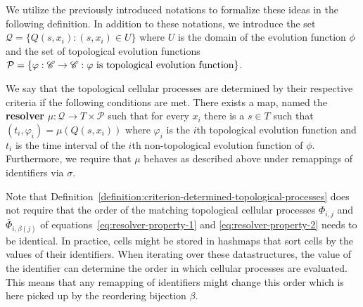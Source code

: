We utilize the previously introduced notations to formalize these ideas in the following definition.
In addition to these notations, we introduce the set $\mathcal{Q}=\{Q(s,x_i):(s,x_i)\in U\}$ where
$U$ is the domain of the evolution function $\phi$ and the set of topological evolution functions
$\mathcal{P}=\{\varphi:\mathscr{C}\rightarrow\mathscr{C}:\varphi\text{ is topological evolution function}\}$.

\begin{definition}
    We say that the topological cellular processes are determined by their respective criteria if
    the following conditions are met.
    There exists a map, named the \textbf{resolver}
    $\mu:\mathcal{Q}\rightarrow T\times\mathcal{P}$ such that for every $x_i$ there is a $s\in T$
    such that $(t_i,\varphi_i)=\mu(Q(s,x_i))$ where $\varphi_i$ is the $i$th topological evolution
    function and $t_i$ is the time interval of the $i$th non-topological evolution function of
    $\phi$.
    Furthermore, we require that $\mu$ behaves as described above under remappings of identifiers
    via $\sigma$.
    \label{definition:criterion-determined-topological-processes}
\end{definition}

Note that Definition~\ref{definition:criterion-determined-topological-processes} does not require
that the order of the matching topological cellular processes $\Phi_{i,j}$ and
$\bar{\Phi}_{i,\beta(j)}$ of equations~\eqref{eq:resolver-property-1} and
\eqref{eq:resolver-property-2} needs to be identical.
In practice, cells might be stored in hashmaps that sort cells by the values of their identifiers.
When iterating over these datastructures, the value of the identifier can determine the order in
which cellular processes are evaluated.
This means that any remapping of identifiers might change this order which is here picked up by the
reordering bijection $\beta$.

